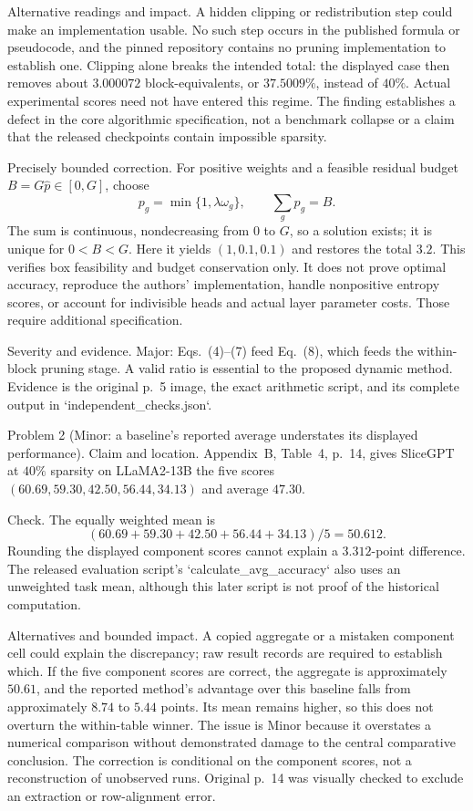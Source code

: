 \documentclass[10pt]{article}
\begin{document}
Alternative readings and impact. A hidden clipping or redistribution step could make an implementation usable. No such step occurs in the published formula or pseudocode, and the pinned repository contains no pruning implementation to establish one. Clipping alone breaks the intended total: the displayed case then removes about \(3.000072\) block-equivalents, or \(37.5009\%\), instead of \(40\%\). Actual experimental scores need not have entered this regime. The finding establishes a defect in the core algorithmic specification, not a benchmark collapse or a claim that the released checkpoints contain impossible sparsity.\par
Precisely bounded correction. For positive weights and a feasible residual budget \(B=G\widehat p\in[0,G]\), choose \[p_g=\min\{1,\lambda\omega_g\},\qquad \sum_g p_g=B.\] The sum is continuous, nondecreasing from \(0\) to \(G\), so a solution exists; it is unique for \(0<B<G\). Here it yields \((1,0.1,0.1)\) and restores the total \(3.2\). This verifies box feasibility and budget conservation only. It does not prove optimal accuracy, reproduce the authors’ implementation, handle nonpositive entropy scores, or account for indivisible heads and actual layer parameter costs. Those require additional specification.\par
Severity and evidence. Major: Eqs. (4)–(7) feed Eq. (8), which feeds the within-block pruning stage. A valid ratio is essential to the proposed dynamic method. Evidence is the original p. 5 image, the exact arithmetic script, and its complete output in `independent\_checks.json`.\par
Problem 2 (Minor: a baseline’s reported average understates its displayed performance).  Claim and location. Appendix B, Table 4, p. 14, gives SliceGPT at \(40\%\) sparsity on LLaMA2-13B the five scores \((60.69,59.30,42.50,56.44,34.13)\) and average \(47.30\).\par
Check. The equally weighted mean is \[(60.69+59.30+42.50+56.44+34.13)/5=50.612.\] Rounding the displayed component scores cannot explain a \(3.312\)-point difference. The released evaluation script’s `calculate\_avg\_accuracy` also uses an unweighted task mean, although this later script is not proof of the historical computation.\par
Alternatives and bounded impact. A copied aggregate or a mistaken component cell could explain the discrepancy; raw result records are required to establish which. If the five component scores are correct, the aggregate is approximately \(50.61\), and the reported method’s advantage over this baseline falls from approximately \(8.74\) to \(5.44\) points. Its mean remains higher, so this does not overturn the within-table winner. The issue is Minor because it overstates a numerical comparison without demonstrated damage to the central comparative conclusion. The correction is conditional on the component scores, not a reconstruction of unobserved runs. Original p. 14 was visually checked to exclude an extraction or row-alignment error.\par
\end{document}
